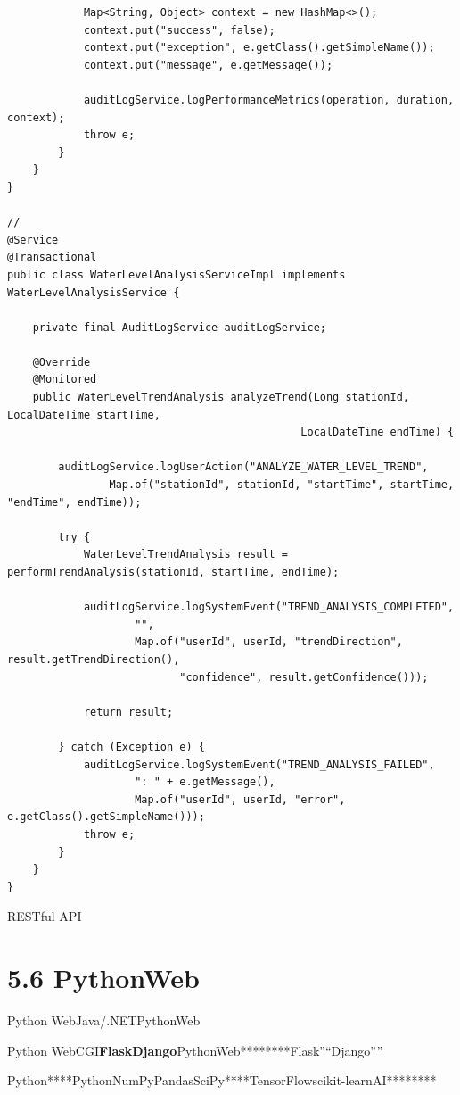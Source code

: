 \begin{verbatim}
            Map<String, Object> context = new HashMap<>();
            context.put("success", false);
            context.put("exception", e.getClass().getSimpleName());
            context.put("message", e.getMessage());
            
            auditLogService.logPerformanceMetrics(operation, duration, context);
            throw e;
        }
    }
}

// 
@Service
@Transactional
public class WaterLevelAnalysisServiceImpl implements WaterLevelAnalysisService {
    
    private final AuditLogService auditLogService;
    
    @Override
    @Monitored
    public WaterLevelTrendAnalysis analyzeTrend(Long stationId, LocalDateTime startTime, 
                                              LocalDateTime endTime) {
        
        auditLogService.logUserAction("ANALYZE_WATER_LEVEL_TREND", 
                Map.of("stationId", stationId, "startTime", startTime, "endTime", endTime));
        
        try {
            WaterLevelTrendAnalysis result = performTrendAnalysis(stationId, startTime, endTime);
            
            auditLogService.logSystemEvent("TREND_ANALYSIS_COMPLETED", 
                    "", 
                    Map.of("userId", userId, "trendDirection", result.getTrendDirection(),
                           "confidence", result.getConfidence()));
            
            return result;
            
        } catch (Exception e) {
            auditLogService.logSystemEvent("TREND_ANALYSIS_FAILED", 
                    ": " + e.getMessage(),
                    Map.of("userId", userId, "error", e.getClass().getSimpleName()));
            throw e;
        }
    }
}
\end{verbatim}

RESTful API

\section{5.6 PythonWeb}\label{pythonweb}

Python WebJava/.NETPythonWeb

Python WebCGI\textbf{FlaskDjango}PythonWeb********Flask''``Django''''

Python****PythonNumPyPandasSciPy****TensorFlowscikit-learnAI********

